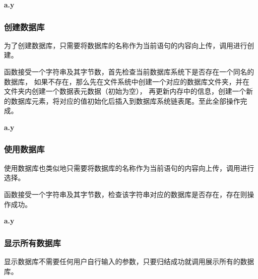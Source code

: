\documentclass{article}
\begin{document}
\begin{spacing}{2}
            \textbf{a.y}
            \begin{spacing}{1.15}
            
            \end{spacing}

        \subsubsection{创建数据库}
            为了创建数据库，只需要将数据库的名称作为当前语句的内容向上传，调用进行创建。

            函数接受一个字符串及其字节数，首先检查当前数据库系统下是否存在一个同名的数据库，
            如果不存在，那么先在文件系统中创建一个对应的数据库文件夹，并在文件夹内创建一个数据表元数据（初始为空），
            再更新内存中的信息，创建一个新的数据库元素，将对应的值初始化后插入到数据库系统链表尾。至此全部操作完成。

            \textbf{a.y}
            \begin{spacing}{1.15}
            
            \end{spacing}
            
        \subsubsection{使用数据库}
            使用数据库也类似地只需要将数据库的名称作为当前语句的内容向上传，调用进行选择。

            函数接受一个字符串及其字节数，检查该字符串对应的数据库是否存在，存在则操作成功。

            \textbf{a.y}
            \begin{spacing}{1.15}
            
            \end{spacing}
        \subsubsection{显示所有数据库}
            显示数据库不需要任何用户自行输入的参数，只要归结成功就调用展示所有的数据库。


\end{spacing}
\end{document}
